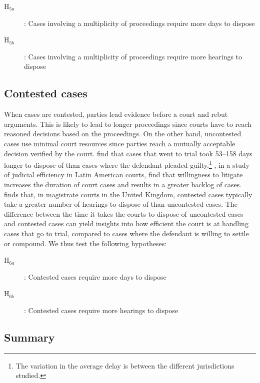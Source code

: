 \documentclass[12pt,a4paper]{article}
\begin{document}
\begin{description}
\item[H$_{5a}$]: Cases involving a multiplicity of proceedings require more days to dispose
\item[H$_{5b}$]: Cases involving a multiplicity of proceedings require more hearings to dispose
\end{description}

\subsection{Contested cases}
\label{sec:contested_cases_meth}
When cases are contested, parties lead evidence before a court and rebut arguments. This is likely to lead to longer proceedings since courts have to reach reasoned decisions based on the proceedings. On the other hand, uncontested cases use minimal court resources since parties reach a mutually acceptable decision verified by the court. \textcite{ostrom2000efficiency} find that cases that went to trial took 53--158 days longer to dispose of than cases where the defendant pleaded guilty.\footnote{The variation in the average delay is between the different jurisdictions studied.} \textcite{buscaglia1997_latinAmericaCourtDelays}, in a study of judicial efficiency in Latin American courts, find that willingness to litigate increases the duration of court cases and results in a greater backlog of cases. \textcite{crownProsecutionService2006_magistrateCourtEfficiency} finds that, in magistrate courts in the United Kingdom, contested cases typically take a greater number of hearings to dispose of than uncontested cases. The difference between the time it takes the courts to dispose of uncontested cases and contested cases can yield insights into how efficient the court is at handling cases that go to trial, compared to cases where the defendant is willing to settle or compound. We thus test the following hypotheses:

\begin{description}
\item[H$_{6a}$]: Contested cases require more days to dispose
\item[H$_{6b}$]: Contested cases require more hearings to dispose
\end{description}

\subsection{Summary}
\end{document}
